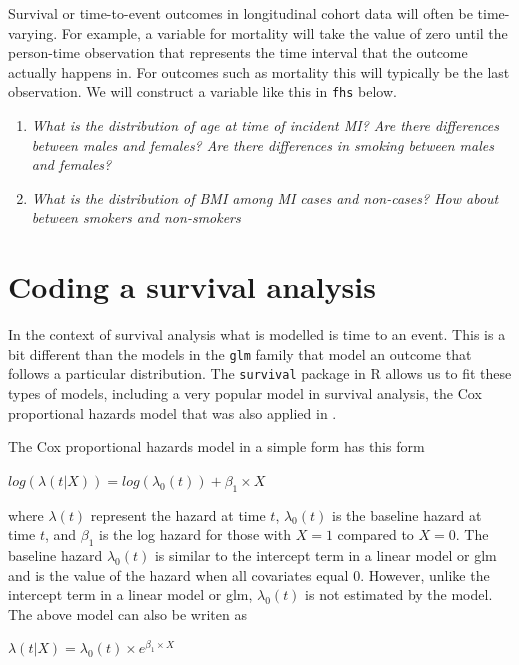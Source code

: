\documentclass[
]{book}
\begin{document}
Survival or time-to-event outcomes in longitudinal cohort data will often be time-varying. For example, a variable for mortality will take the value of zero until the person-time observation that represents the time interval that the outcome actually happens in. For outcomes such as mortality this will typically be the last observation. We will construct a variable like this in \texttt{fhs} below.

\begin{enumerate}
\def\labelenumi{\arabic{enumi}.}
\setcounter{enumi}{3}
\item
  \emph{What is the distribution of age at time of incident MI? Are there differences between males and females? Are there differences in smoking between males and females?}
\item
  \emph{What is the distribution of BMI among MI cases and non-cases? How about between smokers and non-smokers}
\end{enumerate}

\hypertarget{coding-a-survival-analysis}{%
\section{Coding a survival analysis}\label{coding-a-survival-analysis}}

In the context of survival analysis what is modelled is time to an event. This is
a bit different than the models in the \texttt{glm} family that model an outcome that follows
a particular distribution. The \texttt{survival} package in R allows us to fit these types of models, including a very popular model in survival analysis, the Cox proportional
hazards model that was also applied in \citet{wong1989risk}.

The Cox proportional hazards model in a simple form has this form

\(log(\lambda(t|X))=log(\lambda_{0}(t))+\beta_{1}\times X\)

where \(\lambda(t)\) represent the hazard at time \(t\), \(\lambda_{0}(t)\) is the baseline hazard at time \(t\), and \(\beta_{1}\) is the log hazard for those with \(X=1\) compared to \(X=0\). The baseline hazard \(\lambda_{0}(t)\) is similar to the intercept term in a linear model or glm and is the value of the hazard when all covariates equal 0. However, unlike the intercept term in a linear model or glm, \(\lambda_{0}(t)\) is not estimated by the model.
The above model can also be writen as

\(\lambda(t|X)=\lambda_{0}(t)\times e^{\beta_{1}\times X}\)
\end{document}
